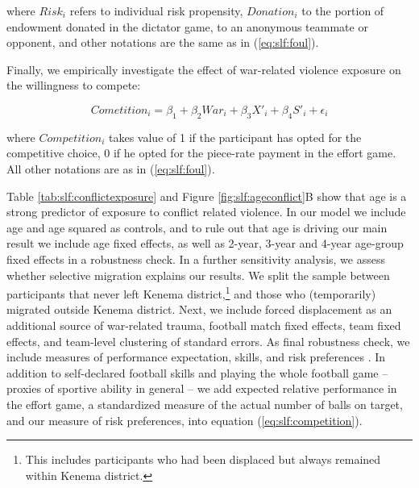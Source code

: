 where $Risk_i$ refers to individual risk propensity, $Donation_i$ to the portion of endowment donated in the dictator game, to an anonymous teammate or opponent, and other notations are the same as in (\ref{eq:slf:foul}).

Finally, we empirically investigate the effect of war-related violence exposure on the willingness to compete:

\begin{equation}
\label{eq:slf:competition}
Cometition_i = \beta_1 + \beta_2 War_i + \beta_3 X'_i + \beta_4 S'_i + \epsilon_i
\end{equation}

where $Competition_i$ takes value of 1 if the participant has opted for the competitive choice, 0 if he opted for the piece-rate payment in the effort game. All other notations are as in (\ref{eq:slf:foul}).

Table \ref{tab:slf:conflictexposure} and Figure \ref{fig:slf:ageconflict}B show that age is a strong predictor of exposure to conflict related violence. In our model we include age and age squared as controls, and to rule out that age is driving our main result we include age fixed effects, as well as 2-year, 3-year and 4-year age-group fixed effects in a robustness check. In a further sensitivity analysis, we assess whether selective migration explains our results. We split the sample between participants that never left Kenema district,\footnote{This includes participants who had been displaced but always remained within Kenema district.} and those who (temporarily) migrated outside Kenema district. Next, we include forced displacement as an additional source of war-related trauma, football match fixed effects, team fixed effects, and team-level clustering of standard errors. As final robustness check, we include measures of performance expectation, skills, and risk preferences \citep{Niederle2007,Bartling2009b}. In addition to self-declared football skills and playing the whole football game – proxies of sportive ability in general – we add expected relative performance in the effort game, a standardized measure of the actual number of balls on target, and our measure of risk preferences, into equation (\ref{eq:slf:competition}). 

